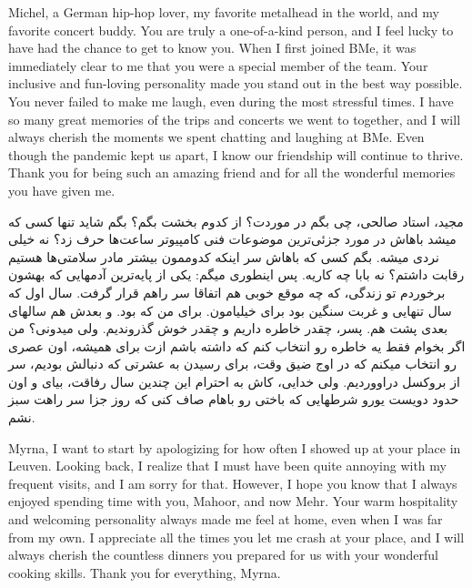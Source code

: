 Michel, a German hip-hop lover, my favorite metalhead in the world, and my favorite concert buddy. You are truly a one-of-a-kind person, and I feel lucky to have had the chance to get to know you. When I first joined BMe, it was immediately clear to me that you were a special member of the team. Your inclusive and fun-loving personality made you stand out in the best way possible. You never failed to make me laugh, even during the most stressful times. I have so many great memories of the trips and concerts we went to together, and I will always cherish the moments we spent chatting and laughing at BMe. Even though the pandemic kept us apart, I know our friendship will continue to thrive. Thank you for being such an amazing friend and for all the wonderful memories you have given me.

\begin{flushright}
\foreignlanguage{persian}
{
مجید، استاد صالحی، چی بگم در موردت؟ از کدوم بخشت بگم؟ بگم شاید تنها کسی که میشد باهاش در مورد جزئی‌ترین موضوعات فنی کامپیوتر ساعت‌ها حرف زد؟ نه خیلی نردی میشه. بگم کسی که باهاش سر اینکه کدوممون بیشتر مادر سلامتی‌ها هستیم رقابت داشتم؟ نه بابا چه کاریه. پس اینطوری میگم: یکی از پایه‌ترین آدمهایی که بهشون برخوردم تو زندگی، که چه موقع خوبی هم اتفاقا سر راهم قرار گرفت. سال اول که سال تنهایی و غربت سنگین بود برای خیلیامون. برای من که بود. و بعدش هم سالهای بعدی پشت هم. پسر، چقدر خاطره داریم و چقدر خوش گذروندیم. ولی میدونی؟ من اگر بخوام فقط یه خاطره رو انتخاب کنم که داشته باشم ازت برای همیشه، اون عصری رو انتخاب میکنم که در اوج ضیق وقت، برای رسیدن به عشرتی که دنبالش بودیم، سر از بروکسل دراووردیم. ولی خدایی، کاش به احترام این چندین سال رفاقت، بیای و اون حدود دویست یورو شرطهایی که باختی رو باهام صاف کنی که روز جزا سر راهت سبز نشم.
}
\end{flushright}

Myrna, I want to start by apologizing for how often I showed up at your place in Leuven. Looking back, I realize that I must have been quite annoying with my frequent visits, and I am sorry for that. However, I hope you know that I always enjoyed spending time with you, Mahoor, and now Mehr. Your warm hospitality and welcoming personality always made me feel at home, even when I was far from my own. I appreciate all the times you let me crash at your place, and I will always cherish the countless dinners you prepared for us with your wonderful cooking skills. Thank you for everything, Myrna.

